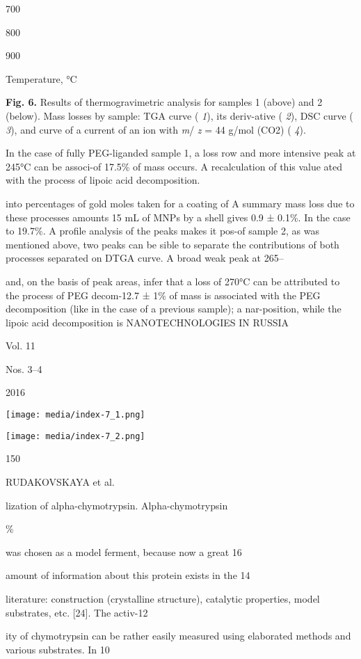 \documentclass[12pt,a4paper]{article}
\begin{document}
700

800

900

Temperature, °C

\textbf{Fig. 6.} Results of thermogravimetric analysis for samples 1
(above) and 2 (below). Mass losses by sample: TGA curve ( \emph{1}), its
deriv-ative ( \emph{2}), DSC curve ( \emph{3}), and curve of a current
of an ion with \emph{m}/ \emph{z} = 44 g/mol (CO2) ( \emph{4}).

In the case of fully PEG-liganded sample 1, a loss row and more
intensive peak at 245°C can be associ-of 17.5\% of mass occurs. A
recalculation of this value ated with the process of lipoic acid
decomposition.

into percentages of gold moles taken for a coating of A summary mass
loss due to these processes amounts 15 mL of MNPs by a shell gives 0.9 ±
0.1\%. In the case to 19.7\%. A profile analysis of the peaks makes it
pos-of sample 2, as was mentioned above, two peaks can be sible to
separate the contributions of both processes separated on DTGA curve. A
broad weak peak at 265--

and, on the basis of peak areas, infer that a loss of 270°C can be
attributed to the process of PEG decom-12.7 ± 1\% of mass is associated
with the PEG decomposition (like in the case of a previous sample); a
nar-position, while the lipoic acid decomposition is NANOTECHNOLOGIES IN
RUSSIA

Vol. 11

Nos. 3--4

2016

\texttt{[image: media/index-7\_1.png]}

\texttt{[image: media/index-7\_2.png]}

150

RUDAKOVSKAYA et al.

lization of alpha-chymotrypsin. Alpha-chymotrypsin

\%

was chosen as a model ferment, because now a great 16

amount of information about this protein exists in the 14

literature: construction (crystalline structure), catalytic properties,
model substrates, etc. {[}24{]}. The activ-12

ity of chymotrypsin can be rather easily measured using elaborated
methods and various substrates. In 10
\end{document}
